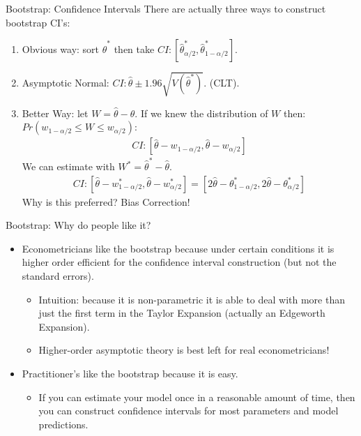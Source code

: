 \documentclass[11pt,handout,xcolor=pdftex,dvipsnames,table,mathserif,aspectratio=169]{beamer}
\begin{document}
\begin{frame}{Bootstrap: Confidence Intervals}
There are actually three ways to construct bootstrap CI's:
\begin{enumerate}
\item Obvious way: sort  $\hat{\theta}^{*}$ then take $CI: [\hat{\theta}^{*}_{\alpha/2},\hat{\theta}^{*}_{1-\alpha/2}]$.
\item Asymptotic Normal:  $CI: \hat{\theta} \pm 1.96 \sqrt{V(\hat{\theta}^{*})}$. (CLT).
\item Better Way: let $W= \hat{\theta} -\theta$. If we knew the distribution of $W$ then: $Pr(w_{1-\alpha/2} \leq W \leq w_{\alpha/2})$:
\begin{eqnarray*}
CI: [\hat{\theta} -w_{1-\alpha/2}, \hat{\theta} -w_{\alpha/2}]
\end{eqnarray*}
We can estimate with $W^{*} = \hat{\theta}^{*} - \hat{\theta}$.
\begin{eqnarray*}
CI: [\hat{\theta} -w^*_{1-\alpha/2}, \hat{\theta} -w^*_{\alpha/2}] = [2 \hat{\theta} -\theta^*_{1-\alpha/2}, 2 \hat{\theta} -\theta^*_{\alpha/2}]
\end{eqnarray*}
Why is this preferred? Bias Correction!
\end{enumerate}

\end{frame}


\begin{frame}{Bootstrap: Why do people like it?}
\begin{itemize}
\item Econometricians like the bootstrap because under certain conditions it is \alert{higher order efficient} for the confidence interval construction (but not the standard errors).
\begin{itemize}
\item Intuition: because it is non-parametric it is able to deal with more than just the first term in the Taylor Expansion (actually an \alert{Edgeworth Expansion}).
\item Higher-order asymptotic theory is best left for real econometricians!
\end{itemize}
\item Practitioner's like the bootstrap because it is easy.
\begin{itemize}
\item If you can estimate your model once in a reasonable amount of time, then you can construct confidence intervals for most parameters and model predictions.
\end{itemize}
\end{itemize}
\end{frame}
\end{document}
